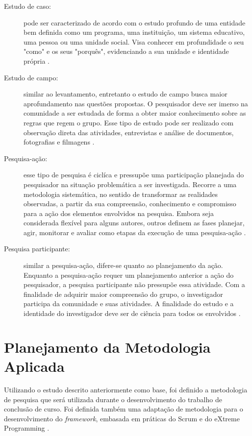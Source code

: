 \begin{description}
\item[Estudo de caso:] pode ser caracterizado de acordo com o estudo profundo de uma entidade bem definida como um programa, uma instituição, um sistema educativo, uma pessoa ou uma unidade social. Visa conhecer em profundidade o seu "como" e os seus "porquês", evidenciando a sua unidade e identidade própria \cite{prodanov2013}. 

\item[Estudo de campo:] similar ao levantamento, entretanto o estudo de campo busca maior aprofundamento nas questões propostas. O pesquisador deve ser imerso na comunidade a ser estudada de forma a obter maior conhecimento sobre as regras que regem o grupo. Esse tipo de estudo pode ser realizado com observação direta das atividades, entrevistas e análise de documentos, fotografias e filmagens \cite{tafner2007}.

\item[Pesquisa-ação:] esse tipo de pesquisa é ciclíca e pressupõe uma participação planejada do pesquisador na situação problemática a ser investigada. Recorre a uma metodologia sistemática, no sentido de transformar as realidades observadas, a partir da sua compreensão, conhecimento e compromisso para a ação dos elementos envolvidos na pesquisa\cite{thiollent2009}. Embora seja considerada flexível para alguns autores, outros definem as fases planejar, agir, monitorar e avaliar como etapas da execução de uma pesquisa-ação \cite{ferreira2011}. 

\item[Pesquisa participante:] similar a pesquisa-ação, difere-se quanto ao planejamento da ação. Enquanto a pesquisa-ação requer um planejamento anterior a ação do pesquisador, a pesquisa participante não pressupõe essa atividade. Com a finalidade de adquirir maior compreensão do grupo, o investigador participa da comunidade e suas atividades. A finalidade do estudo e a identidade do investigador deve ser de ciência para todos os envolvidos \cite{tafner2007}.
\end{description}

 \section{Planejamento da Metodologia Aplicada}
  
Utilizando o estudo descrito anteriormente como base, foi definido a metodologia de pesquisa que será utilizada durante o desenvolvimento do trabalho de conclusão de curso.  Foi definida também uma adaptação de metodologia para o desenvolvimento do \textit{framework}, embasada em práticas do Scrum \cite{scrum2014} e do eXtreme Programming \cite{wells2009}.  
  
